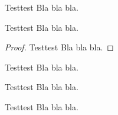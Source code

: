 \documentclass{article}
\begin{document}
\begin{definition}{Test}{test}
	Bla bla bla.
\end{definition}
\begin{theorem}{Test}{test}
	Bla bla bla.
\end{theorem}
\begin{proof}{Test}{test}
	Bla bla bla.
\end{proof}
\begin{example}{Test}{test}
	Bla bla bla.
\end{example}
\begin{note}{Test}{test}
	Bla bla bla.
\end{note}
\begin{challange}{Test}{test}
	Bla bla bla.
\end{challange}
\end{document}
